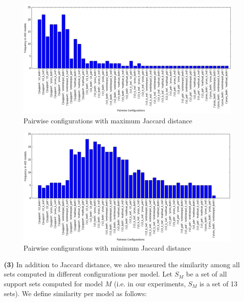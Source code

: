 \begin{figure}
  \centering
  \includegraphics[width=\textwidth]{figs/max_settings_analyses.png}
  \caption{\small{Pairwise configurations with maximum Jaccard distance}}\label{fig:maxdis}
\end{figure}


\begin{figure}
  \centering
  \includegraphics[width=\textwidth]{figs/min_settings_analyses.png}
  \caption{\small{Pairwise configurations with minimum Jaccard distance}}\label{fig:mindis}
\end{figure}

\vspace{6pt}
\noindent{}
 \vspace{9pt}

\textbf{(3)} In addition to Jaccard distance, we also measured the similarity among all sets computed in different configurations per model. Let $S_M$ be a set of all support sets computed for model $M$ (i.e. in our experiments, $S_M$ is a set of 13 sets).  We define similarity per model as follows:

